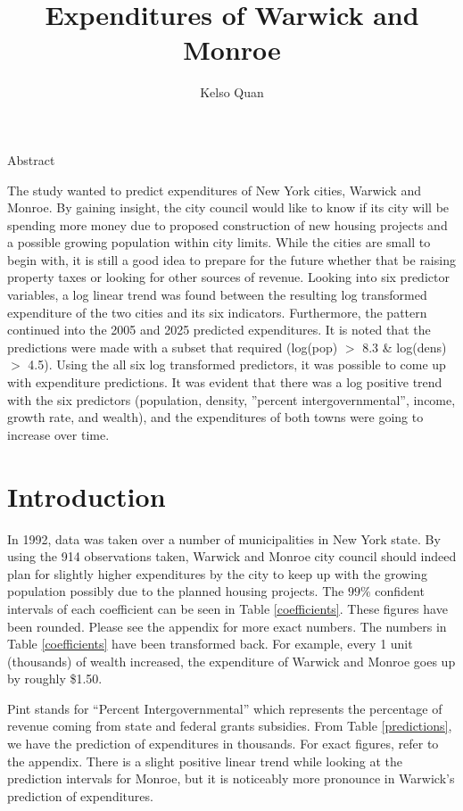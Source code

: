 \documentclass{article}\usepackage[]{graphicx}\usepackage[]{color}
\title{Expenditures of Warwick and Monroe}
\author{Kelso Quan}
\begin{document}
 

\maketitle
\begin{center}
\Large{Abstract}
\end{center}
\qquad The study wanted to predict expenditures of New York cities, Warwick and Monroe. By gaining insight, the city council would like to know if its city will be spending more money  due to proposed construction of new housing projects and a possible growing population within city limits. While the cities are small to begin with, it is still a good idea to prepare for the future whether that be raising property taxes or looking for other sources of revenue. Looking into six predictor variables, a log linear trend was found between the resulting log transformed expenditure of the two cities and its six indicators. Furthermore, the pattern continued into the 2005 and 2025 predicted expenditures. It is noted that the predictions were made with a subset that required (log(pop) $>$ 8.3 \& log(dens) $>$ 4.5). Using the all six log transformed predictors, it was possible to come up with expenditure predictions. It was evident that there was a log positive trend with the six predictors (population, density, ''percent intergovernmental'', income, growth rate, and wealth), and the expenditures of both towns were going to increase over time. 

\section{Introduction}
\qquad In 1992, data was taken over a number of municipalities in New York state. By using the 914 observations taken, Warwick and Monroe city council should indeed plan for slightly higher expenditures by the city to keep up with the growing population possibly due to the planned housing projects. The $99\%$ confident intervals of each coefficient can be seen in Table \ref{coefficients}. These figures have been rounded. Please see the appendix for more exact numbers. The numbers in Table \ref{coefficients} have been transformed back. For example, every 1 unit (thousands) of wealth increased, the expenditure of Warwick and Monroe goes up by roughly \$1.50. 

Pint stands for ``Percent Intergovernmental'' which represents the percentage of revenue coming from state and federal grants subsidies. From Table \ref {predictions}, we have the prediction of expenditures in thousands. For exact figures, refer to the appendix. There is a slight positive linear trend while looking at the prediction intervals for Monroe, but it is noticeably more pronounce in Warwick's prediction of expenditures. 
\end{document}
